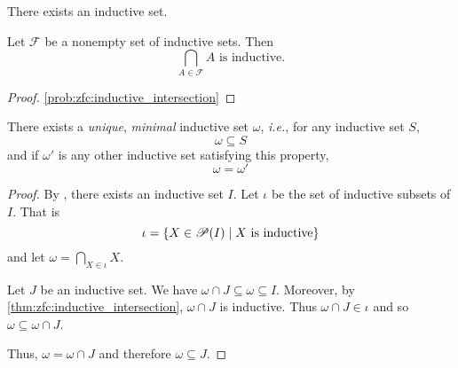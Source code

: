 \begin{axiom} \label{zfc:infinity}
    There exists an inductive set.    
\end{axiom}

\begin{lem} \label{thm:zfc:inductive_intersection}
    Let $\mathscr{F}$ be a nonempty set of inductive sets.
    Then \[
        \bigcap_{A \in \mathscr{F}}{A} \text{ is inductive.}
    \]
\end{lem}
\begin{proof}
    \cref{prob:zfc:inductive_intersection}
\end{proof}

\begin{thm} \label{thm:zfc:omega}
    There exists a \emph{unique}, \emph{minimal} inductive set $\omega$, \textit{i.e.}, for any inductive set $S$, \[
        \omega \subseteq S
    \] and if $\omega'$ is any other inductive set satisfying this property, \[
        \omega = \omega'
    \]
\end{thm}
\begin{proof}
    By , there exists an inductive set $I$.
    Let $\iota$ be the set of inductive subsets of $I$.
    That is \[
        \iota = \set{X \in \mathscr{P}(I) \mid
        X \text{ is inductive}}
    \] and let $\omega = \bigcap_{X \in \iota}{X}$.

    Let $J$ be an inductive set.
    We have $\omega \cap J \subseteq \omega \subseteq I$.
    Moreover, by \cref{thm:zfc:inductive_intersection}, $\omega \cap J$
    is inductive.
    Thus $\omega \cap J \in \iota$ and so $\omega \subseteq \omega \cap J$.

    Thus, $\omega = \omega \cap J$ and therefore $\omega \subseteq J$.
\end{proof}

